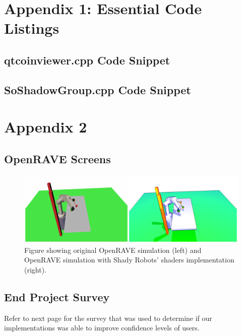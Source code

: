 \documentclass[10pt,journal,compsoc,draftclsnofoot]{IEEEtran}
\begin{document}
\begin{flushleft}
\newpage

\section{Appendix 1: Essential Code Listings}

\subsection{qtcoinviewer.cpp Code Snippet}


\newpage

\subsection{SoShadowGroup.cpp Code Snippet}


\newpage

\section{Appendix 2}
\subsection{OpenRAVE Screens}
\begin{figure} [H]
  \includegraphics[scale=0.8]{beforeAfter_1.eps}
  \caption
{ \newline \hspace{\linewidth}
Figure showing original OpenRAVE simulation (left) and OpenRAVE simulation with Shady Robots' shaders implementation (right).}
  \label{fig:beforeafter}
\end{figure}

\subsection{End Project Survey}
Refer to next page for the survey that was used to determine if our implementations was able to improve confidence levels of users.




\end{flushleft}
\end{document}
